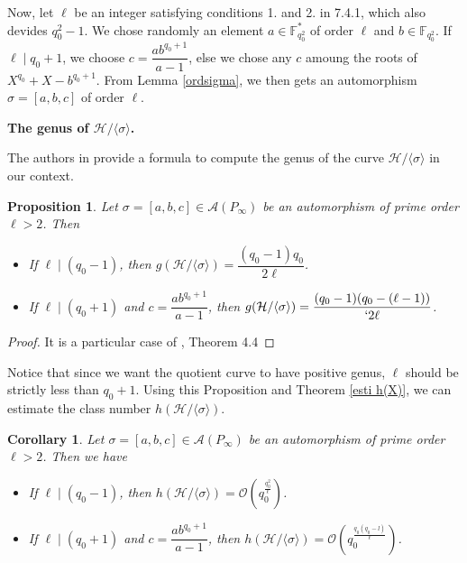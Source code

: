 \documentclass[10pt]{article}
\newtheorem{prop1}{Proposition}[]
\newtheorem{coro1}{Corollary}[]
\newcommand{\s}{\vspace{0.3cm}}
\newcommand{\calA}{\mathcal{A}}
\newcommand{\calH}{\mathcal{H}}
\newcommand{\calO}{\mathcal{O}}
\begin{document}
Now, let $\ell$ be an integer satisfying conditions 1. and 2. in 7.4.1, which also devides $q_0^2-1$. We chose randomly an element $a \in \mathbb{F}_{q_0^2}^*$ of order $\ell$ and $b \in \mathbb{F}_{q_0^2}$. If $\ell \mid q_0+1$, we choose $c=\dfrac{ab^{q_0+1}}{a-1}$, else we chose any $c$ amoung the roots of $X^{q_0}+X-b^{q_0+1}$. From Lemma \ref{ordsigma}, we then gets an automorphism $\sigma = [a,b,c]$ of order $\ell$.

\s

\bf{The genus of $\calH/\langle \sigma \rangle$}. \rm 

\s

The authors in \cite{Gar} provide a formula to compute the genus of the curve $\calH/\langle \sigma \rangle$ in our context.

\s

\begin{prop1} \label{genus}
Let $\sigma = [a,b,c] \in \calA(P_{\infty})$ be an automorphism of prime order $\ell > 2$. Then 
\begin{itemize}
\item[(i)] If $\ell \mid (q_0-1)$, then $g(\calH/\langle \sigma \rangle) = \dfrac{(q_0-1)q_0}{2\ell}$.
\item[(ii)] If $\ell \mid (q_0+1)$ and $c = \dfrac{ab^{q_0+1}}{a-1}$, then $g(\calH/\langle \sigma \rangle) = \dfrac{(q_0-1)(q_0-(\ell-1))}{`2\ell}$.
\end{itemize}
\end{prop1}

\s

\begin{proof}
It is a particular case of \cite{Gar}, Theorem 4.4
\end{proof}

Notice that since we want the quotient curve to have positive genus, $\ell$ should be strictly less than $q_0+1$. Using this Proposition and Theorem \ref{esti h(X)}, we can estimate the class number $h(\calH/\langle \sigma \rangle)$.

\s

\begin{coro1} \label{lastcorollary}
Let $\sigma = [a,b,c] \in \calA(P_{\infty})$ be an automorphism of prime order $\ell > 2$. Then we have 
\begin{itemize}
\item[(i)] If $\ell \mid (q_0-1)$, then $h(\calH/\langle \sigma \rangle) = \calO \left(q_0^{\frac{q_0^2}{\ell}}\right)$.
\item[(ii)] If $\ell \mid (q_0+1)$ and $c=\dfrac{ab^{q_0+1}}{a-1}$, then $h(\calH/\langle \sigma \rangle) = \calO \left(q_0^{\frac{q_0(q_0-l)}{\ell}}\right)$.
\end{itemize}
\end{coro1}
\end{document}
